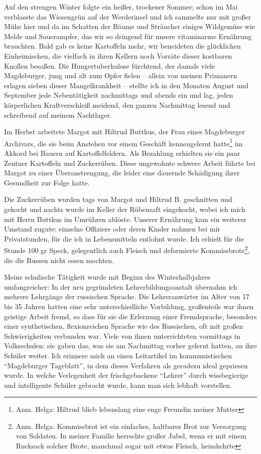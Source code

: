 Auf den strengen Winter folgte ein heißer, trockener Sommer; schon im Mai verblasste das Wiesengrün auf der Werderinsel und ich sammelte nur mit großer Mühe hier und da im Schatten der Bäume und Sträucher einiges Wildgemüse wie Melde und Sauerampfer, das wir so dringend für unsere vitaminarme Ernährung brauchten. Bald gab es keine Kartoffeln mehr, wir beneideten die glücklichen Einheimischen, die vielfach in ihren Kellern noch Vorräte dieser kostbaren Knollen besaßen. Die Hungertuberkulose fürchtend, der damals viele Magdeburger, jung und alt zum Opfer fielen --  allein von meinen Primanern erlagen sieben dieser Mangelkrankheit -- stellte ich in den Monaten August und September jede Nebentätigkeit nachmittags und abends ein und lag, jeden körperlichen Kraftverschleiß meidend, den ganzen Nachmittag lesend und schreibend auf meinem Nachtlager.

Im Herbst arbeitete Margot mit Hiltrud Buttkus, der Frau eines Magdeburger Archivars, die sie beim Anstehen vor einem Geschäft kennengelernt hatte\footnote{Anm. Helga: Hiltrud blieb lebenslang eine enge Freundin meiner Mutter} im Akkord bei Bauern auf Kartoffelfeldern. Als Bezahlung erhielten sie ein paar Zentner Kartoffeln und Zuckerrüben. Diese ungewohnte schwere Arbeit führte bei Margot zu einer Überanstrengung, die leider eine dauernde Schädigung ihrer Gesundheit zur Folge hatte.

Die Zuckerrüben wurden tags von Margot und Hiltrud B. geschnitten und gekocht und nachts wurde im Keller der Rübensaft eingekocht, wobei ich mich mit Herrn Buttkus im Umrühren ablöste. Unserer Ernährung kam ein weiterer Umstand zugute: einzelne Offiziere oder deren Kinder nahmen bei mir Privatstunden, für die ich in Lebensmitteln entlohnt wurde. Ich erhielt für die Stunde 100 gr Speck, gelegentlich auch Fleisch und deformierte Kommissbrote\footnote{Anm. Helga: Kommissbrot ist ein einfaches, haltbares Brot zur Versorgung von Soldaten. In meiner Familie herrschte großer Jubel, wenn er mit einem Rucksack solcher Brote, manchmal sogar mit etwas Fleisch, heimkehrte}, die die Russen nicht essen mochten.

Meine schulische Tätigkeit wurde mit Beginn des Winterhalbjahres umfangreicher: In der neu gegründeten Lehrerbildungsanstalt übernahm ich mehrere Lehrgänge der russischen Sprache. Die Lehreranwärter im Alter von 17 bis 35 Jahren hatten eine sehr unterschiedliche Vorbildung, großenteils war ihnen geistige Arbeit fremd, so dass für sie die Erlernung einer Fremdsprache, besonders einer synthetischen, flexionreichen Sprache wie des Russischen, oft mit großen Schwierigkeiten verbunden war. Viele von ihnen unterrichteten vormittags in Volksschulen: sie gaben das, was sie am Nachmittag vorher gelernt hatten, an ihre Schüler weiter. Ich erinnere mich an einen Leitartikel im kommunistischen \enquote{Magdeburger Tageblatt},  in dem dieses Verfahren als geradezu ideal gepriesen wurde. In welche Verlegenheit der frischgebackene \enquote{Lehrer} durch wissbegierige und intelligente Schüler gebracht wurde, kann man sich lebhaft vorstellen.

